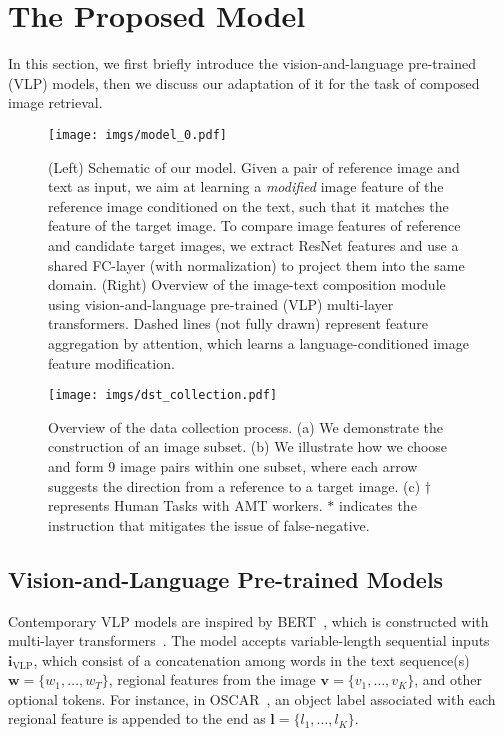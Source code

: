 \documentclass[10pt,twocolumn,letterpaper]{article}
\begin{document}
\section{The Proposed Model}\label{model}
In this section, we first briefly introduce the vision-and-language pre-trained (VLP) models, then we discuss our adaptation of it for the task of composed image retrieval. 

\begin{figure*}[t!]
  \begin{center}
    \texttt{[image: imgs/model\_0.pdf]}
  \end{center}
  \caption{(Left) Schematic of our model. Given a pair of reference image and text as input, we aim at learning a \textit{modified} image feature of the reference image conditioned on the text, such that it matches the feature of the target image. To compare image features of reference and candidate target images, we extract ResNet features and use a shared FC-layer (with normalization) to project them into the same domain. (Right) Overview of the image-text composition module using vision-and-language pre-trained (VLP) multi-layer transformers. Dashed lines (not fully drawn) represent feature aggregation by attention, which learns a language-conditioned image feature modification.}
  \label{fig:model-0}
  \vspace{-1.0em}
\end{figure*}

 
\begin{figure*}[!ht]
  \centering
    \texttt{[image: imgs/dst\_collection.pdf]}
  \caption{Overview of the data collection process. (a) We demonstrate the construction of an image subset. (b) We illustrate how we choose and form 9 image pairs within one subset, where each arrow suggests the direction from a reference to a target image. (c) $\dagger$ represents Human Tasks with AMT workers. $\ast$ indicates the instruction that mitigates the issue of false-negative.}
  \label{fig:dset_collection_0}
\end{figure*}

\subsection{Vision-and-Language Pre-trained Models}

Contemporary VLP models are inspired by BERT~\cite{devlin2018bert_bert}, which is constructed with multi-layer transformers~\cite{vaswani2017attention_transformer}. 
The model accepts variable-length sequential inputs $\boldsymbol{i}_{\text{VLP}}$, which consist of a concatenation among words in the text sequence(s) $\boldsymbol{w}=\{w_1,\ldots,w_T\}$, regional features from the image $\boldsymbol{v}=\{v_1,\ldots,v_K\}$, and other optional tokens. For instance, in OSCAR~\cite{oscar}, an object label associated with each regional feature is appended to the end as $\boldsymbol{l}=\{l_1,\ldots,l_K\}$.
\end{document}
